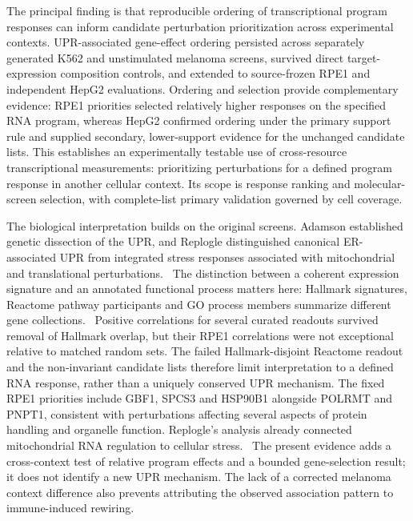 \documentclass[a4paper,fleqn]{cas-sc}
\makeatletter
\DeclareRobustCommand{\rev}[1]{{\color{red}\def\@citecolor{black}\def\@linkcolor{red}\def\@urlcolor{red}#1}}
\let\unmarkedcite\cite
\renewcommand{\cite}[1]{{\color{black}\def\@citecolor{black}\unmarkedcite{#1}}}
\makeatother
\begin{document}
\rev{The principal finding is that reproducible ordering of transcriptional program responses can inform candidate perturbation prioritization across experimental contexts.} \rev{UPR-associated gene-effect ordering persisted across separately generated K562 and unstimulated melanoma screens, survived direct target-expression composition controls, and extended to source-frozen RPE1 and independent HepG2 evaluations.} \rev{Ordering and selection provide complementary evidence: RPE1 priorities selected relatively higher responses on the specified RNA program, whereas HepG2 confirmed ordering under the primary support rule and supplied secondary, lower-support evidence for the unchanged candidate lists.} \rev{This establishes an experimentally testable use of cross-resource transcriptional measurements: prioritizing perturbations for a defined program response in another cellular context.} \rev{Its scope is response ranking and molecular-screen selection, with complete-list primary validation governed by cell coverage.}

\rev{The biological interpretation builds on the original screens.} \rev{Adamson established genetic dissection of the UPR, and Replogle distinguished canonical ER-associated UPR from integrated stress responses associated with mitochondrial and translational perturbations.~\cite{adamson2016,replogle2022}} \rev{The distinction between a coherent expression signature and an annotated functional process matters here: Hallmark signatures, Reactome pathway participants and GO process members summarize different gene collections.~\cite{liberzon2015,go2000,go2026,reactome2024}} \rev{Positive correlations for several curated readouts survived removal of Hallmark overlap, but their RPE1 correlations were not exceptional relative to matched random sets.} \rev{The failed Hallmark-disjoint Reactome readout and the non-invariant candidate lists therefore limit interpretation to a defined RNA response, rather than a uniquely conserved UPR mechanism.} \rev{The fixed RPE1 priorities include GBF1, SPCS3 and HSP90B1 alongside POLRMT and PNPT1, consistent with perturbations affecting several aspects of protein handling and organelle function.} \rev{Replogle's analysis already connected mitochondrial RNA regulation to cellular stress.~\cite{replogle2022}} \rev{The present evidence adds a cross-context test of relative program effects and a bounded gene-selection result; it does not identify a new UPR mechanism.} \rev{The lack of a corrected melanoma context difference also prevents attributing the observed association pattern to immune-induced rewiring.~\cite{frangieh2021}}
\end{document}
